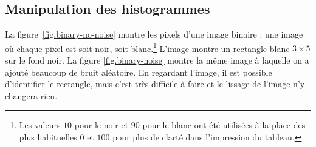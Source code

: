 \subsection{Manipulation des histogrammes}

La figure~\ref{fig.binary-no-noise} montre les pixels d'une image binaire : une image où chaque pixel est soit noir, soit blanc.\footnote{Les valeurs $10$ pour le noir et $90$ pour le blanc ont été utilisées à la place des plus habituelles $0$ et $100$ pour plus de clarté dans l'impression du tableau.} L'image montre un rectangle blanc $3\times 5$ sur le fond noir. La figure \ref{fig.binary-noise} montre la même image à laquelle on a ajouté beaucoup de bruit aléatoire. En regardant l'image, il est possible d'identifier le rectangle, mais c'est très difficile à faire et le lissage de l'image n'y changera rien.

